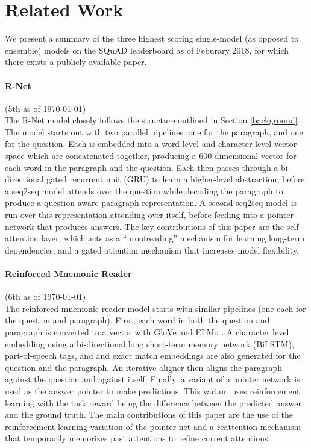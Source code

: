 \documentclass{article}
\begin{document}
\section{Related Work} \label{related}
We present a summary of the three highest scoring single-model (as opposed to ensemble) models on the SQuAD leaderboard as of Feburary 2018, for which there exists a publicly available paper. 

\paragraph{R-Net} (5th as of \today) \\
The R-Net \cite{RNet} model closely follows the structure outlined in Section \ref{background}. The model starts out with two parallel pipelines: one for the paragraph, and one for the question. Each is embedded into a word-level and character-level vector space which are concatenated together, producing a 600-dimensional vector for each word in the paragraph and the question. Each then passes through a bi-directional gated recurrent unit (GRU) \cite{GRU} to learn a higher-level abstraction, before a seq2seq model attends over the question while decoding the paragraph to produce a question-aware paragraph representation. A second seq2seq model is run over this representation attending over itself, before feeding into a pointer network that produces answers. The key contributions of this paper are the self-attention layer, which acts as a ``proofreading'' mechanism for learning long-term dependencies, and a gated attention mechanism that increases model flexibility. 
 
\paragraph{Reinforced Mnemonic Reader} (6th as of \today) \\
The reinforced mnemonic reader model \cite{Mnemonic} starts with similar pipelines (one each for the question and paragraph). First, each word in both the question and paragraph is converted to a vector with GloVe and ELMo \cite{ELMo}. A character level embedding using a bi-directional long short-term memory network (BiLSTM), part-of-speech tags, and and exact match embeddings are also generated for the question and the paragraph. An iterative aligner then aligns the paragraph against the question and against itself. Finally, a variant of a pointer network is used as the answer pointer to make predictions. This variant uses reinforcement learning with the task reward being the difference between the predicted answer and the ground truth. The main contributions of this paper are the use of the reinforcement learning variation of the pointer net and a reattention mechanism that temporarily memorizes past attentions to refine current attentions.
\end{document}
